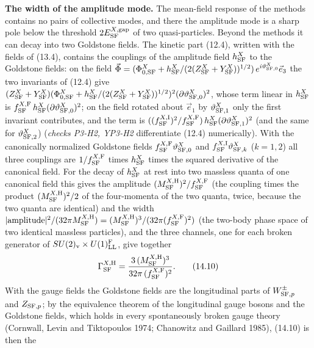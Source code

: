 \documentclass[
  10pt,
]{article}
\begin{document}
\textbf{The width of the amplitude mode.} The mean-field response of the
methods contains no pairs of collective modes, and there the amplitude
mode is a sharp pole below the threshold \(2E^{X,{\rm gap}}_{\rm SF}\)
of two quasi-particles. Beyond the methods it can decay into two
Goldstone fields. The kinetic part (12.4), written with the fields of
(13.4), contains the couplings of the amplitude field \(h^X_{\rm SF}\)
to the Goldstone fields: on the field
\(\vec\Phi=(\Phi^X_{0,{\rm SF}}+h^X_{\rm SF}/(2(Z^X_{\rm SF}+Y^X_{\rm SF}))^{1/2})\,e^{i\vartheta^X_{{\rm SF},0}}\vec e_3\)
the two invariants of (12.4) give
\((Z^X_{\rm SF}+Y^X_{\rm SF})(\Phi^X_{0,{\rm SF}}+h^X_{\rm SF}/(2(Z^X_{\rm SF}+Y^X_{\rm SF}))^{1/2})^2(\partial\vartheta^X_{{\rm SF},0})^2\),
whose term linear in \(h^X_{\rm SF}\) is
\(f^{X,{\rm F}}_{\rm SF}\,h^X_{\rm SF}(\partial\vartheta^X_{{\rm SF},0})^2\);
on the field rotated about \(\vec e_1\) by \(\vartheta^X_{{\rm SF},1}\)
only the first invariant contributes, and the term is
\(((f^{X,{\rm I}}_{\rm SF})^2/f^{X,{\rm F}}_{\rm SF})\,h^X_{\rm SF}(\partial\vartheta^X_{{\rm SF},1})^2\)
(and the same for \(\vartheta^X_{{\rm SF},2}\)) (\emph{checks P3-H2,
YP3-H2} differentiate (12.4) numerically). With the canonically
normalized Goldstone fields
\(f^{X,{\rm F}}_{\rm SF}\vartheta^X_{{\rm SF},0}\) and
\(f^{X,{\rm I}}_{\rm SF}\vartheta^X_{{\rm SF},k}\) (\(k=1,2\)) all three
couplings are \(1/f^{X,{\rm F}}_{\rm SF}\) times \(h^X_{\rm SF}\) times
the squared derivative of the canonical field. For the decay of
\(h^X_{\rm SF}\) at rest into two massless quanta of one canonical field
this gives the amplitude
\((M^{X,{\rm H}}_{\rm SF})^2/f^{X,{\rm F}}_{\rm SF}\) (the coupling
times the product \((M^{X,{\rm H}}_{\rm SF})^2/2\) of the four-momenta
of the two quanta, twice, because the two quanta are identical) and the
width
\(\lvert\text{amplitude}\rvert^2/(32\pi M^{X,{\rm H}}_{\rm SF})=(M^{X,{\rm H}}_{\rm SF})^3/(32\pi(f^{X,{\rm F}}_{\rm SF})^2)\)
(the two-body phase space of two identical massless particles), and the
three channels, one for each broken generator of
\(SU(2)_{\rm v}\times U(1)^{\rm F}_{\rm LL}\), give together
\[\Gamma^{X,{\rm H}}_{\rm SF}=\frac{3\,(M^{X,{\rm H}}_{\rm SF})^3}{32\pi\,(f^{X,{\rm F}}_{\rm SF})^2}.\tag{14.10}\]
With the gauge fields the Goldstone fields are the longitudinal parts of
\(W^\pm_{{\rm SF},p}\) and \(Z_{{\rm SF},p}\); by the equivalence
theorem of the longitudinal gauge bosons and the Goldstone fields, which
holds in every spontaneously broken gauge theory (Cornwall, Levin and
Tiktopoulos 1974; Chanowitz and Gaillard 1985), (14.10) is then the
\end{document}
